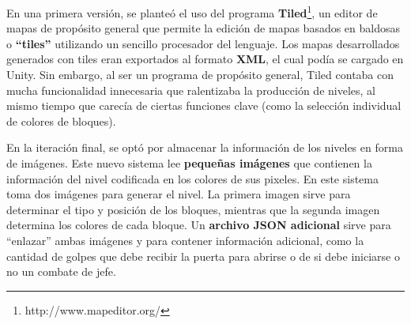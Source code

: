 En una primera versión, se planteó el uso del programa \textbf{Tiled}\footnote{http://www.mapeditor.org/}, un editor de mapas de propósito general que permite la edición de mapas basados en baldosas o \textbf{``tiles''} utilizando un sencillo procesador del lenguaje. Los mapas desarrollados generados con tiles eran exportados al formato \textbf{XML}, el cual podía se cargado en Unity. Sin embargo, al ser un programa de propósito general, Tiled contaba con mucha funcionalidad innecesaria que ralentizaba la producción de niveles, al mismo tiempo que carecía de ciertas funciones clave (como la selección individual de colores de bloques).

En la iteración final, se optó por almacenar la información de los niveles en forma de imágenes. Este nuevo sistema lee \textbf{pequeñas imágenes} que contienen la información del nivel codificada en los colores de sus pixeles. En este sistema toma dos imágenes para generar el nivel. La primera imagen sirve para determinar el tipo y posición de los bloques, mientras que la segunda imagen determina los colores de cada bloque. Un \textbf{archivo JSON adicional} sirve para ``enlazar'' ambas imágenes y para contener información adicional, como la cantidad de golpes que debe recibir la puerta para abrirse o de si debe iniciarse o no un combate de jefe.

